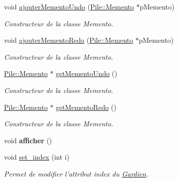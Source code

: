 \begin{DoxyCompactItemize}
\item 
void \hyperlink{class_l_o21_1_1_gardien_a893f075d068eb7cd937845c9604c069e}{ajouter\-Memento\-Undo} (\hyperlink{class_l_o21_1_1_pile_1_1_memento}{\-Pile\-::\-Memento} $\ast$p\-Memento)
\begin{DoxyCompactList}\small\item\em \-Constructeur de la classe \-Memento. \end{DoxyCompactList}\item 
void \hyperlink{class_l_o21_1_1_gardien_a01a57e73de1a335bae9d5c83465d51e3}{ajouter\-Memento\-Redo} (\hyperlink{class_l_o21_1_1_pile_1_1_memento}{\-Pile\-::\-Memento} $\ast$p\-Memento)
\begin{DoxyCompactList}\small\item\em \-Constructeur de la classe \-Memento. \end{DoxyCompactList}\item 
\hyperlink{class_l_o21_1_1_pile_1_1_memento}{\-Pile\-::\-Memento} $\ast$ \hyperlink{class_l_o21_1_1_gardien_a6abc703f1f7847d335bbf4194349082b}{get\-Memento\-Undo} ()
\begin{DoxyCompactList}\small\item\em \-Constructeur de la classe \-Memento. \end{DoxyCompactList}\item 
\hyperlink{class_l_o21_1_1_pile_1_1_memento}{\-Pile\-::\-Memento} $\ast$ \hyperlink{class_l_o21_1_1_gardien_a215a9621ff0092452a9ed46a4539988f}{get\-Memento\-Redo} ()
\begin{DoxyCompactList}\small\item\em \-Constructeur de la classe \-Memento. \end{DoxyCompactList}\item 
\hypertarget{class_l_o21_1_1_gardien_aa833c3f80e13743a175d146a6a3dca94}{void {\bfseries afficher} ()}\label{class_l_o21_1_1_gardien_aa833c3f80e13743a175d146a6a3dca94}

\item 
void \hyperlink{class_l_o21_1_1_gardien_ab2589195775b272fc05bc2de197c96be}{set\-\_\-index} (int i)
\begin{DoxyCompactList}\small\item\em \-Permet de modifier l'attribut index du \hyperlink{class_l_o21_1_1_gardien}{\-Gardien}. \end{DoxyCompactList}\end{DoxyCompactItemize}
